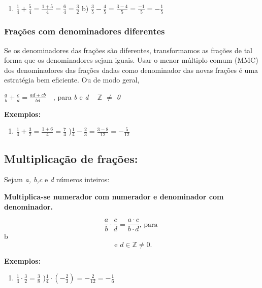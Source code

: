 \begin{enumerate}
	\item  \( \frac{1}{4}+\frac{5}{4}=\frac{1+5}{4}=\frac{6}{4}=\frac{3}{2} \) \quad \quad b)  \( \frac{3}{5}-\frac{4}{5}=\frac{3-4}{5}=\frac{-1}{5}=-\frac{1}{5} \) \quad 
\end{enumerate}

\subsubsection{Frações com denominadores diferentes}

Se os denominadores das frações são diferentes, transformamos as frações de tal forma que os denominadores sejam iguais. Usar o menor múltiplo comum (MMC) dos denominadores das frações dadas como denominador das novas frações é uma estratégia bem eficiente. Ou de modo geral, 

\quad  \( \frac{a}{b}+\frac{c}{d}=\frac{ad+cb}{bd}~~~ \) {\fontsize{16pt}{19.2pt}\selectfont  , para \textit{b }e\textit{ d  ~  \( \mathbb{Z} \)   $ \neq $  0} \qedsymbol{}}

\textbf{Exemplos:}

\begin{enumerate}
	\item  \( \frac{1}{4}+\frac{3}{2}=\frac{1+6}{4}=\frac{7}{4} \) \quad \quad {}){\fontsize{16pt}{19.2pt}\selectfont   \( \frac{1}{4}-\frac{2}{3}=\frac{3-8}{12}=-\frac{5}{12} \) }
\end{enumerate}

\subsection{Multiplicação de frações:}

Sejam \textit{a, b,c} e \textit{d} números inteiros: 

\begin{caixa}
\textbf{Multiplica-se numerador com numerador e denominador com denominador. }

$$ \frac{a}{b} \cdot \frac{c}{d}=\frac{a \cdot c }{b \cdot d}\textrm{,  para }$$ b $$\textrm{ e } d \in \mathbb{Z} \neq 0 \textrm{.}$$
\end{caixa}
\textbf{Exemplos:}

\begin{enumerate}
	\item  \( \frac{1}{4} \cdot \frac{3}{2}=\frac{3}{8} \) \quad \quad {}){\fontsize{16pt}{19.2pt}\selectfont   \( \frac{1}{4} \cdot  \left( -\frac{2}{3} \right) =-\frac{2}{12}=-\frac{1}{6} \) }
\end{enumerate}

